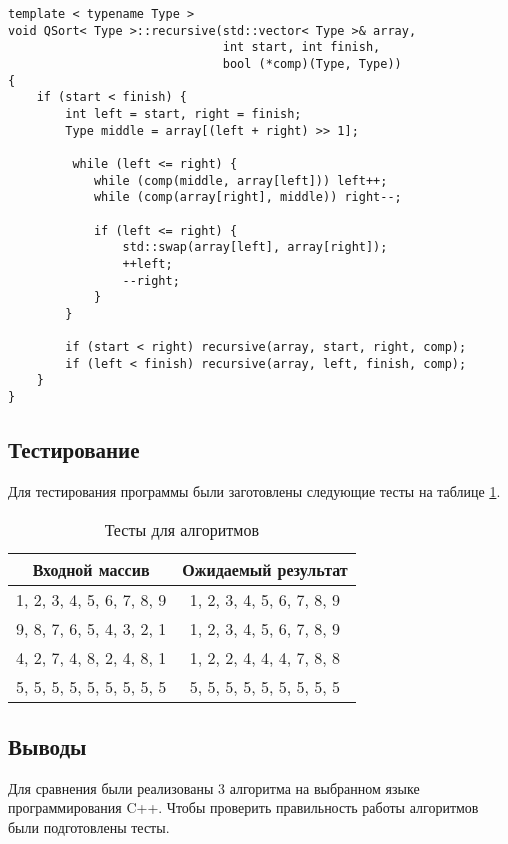 \begin{lstlisting}[caption=Быстрая сортировка,label=list:qsort]
template < typename Type >
void QSort< Type >::recursive(std::vector< Type >& array,
                              int start, int finish,
                              bool (*comp)(Type, Type))
{
    if (start < finish) {
        int left = start, right = finish;
        Type middle = array[(left + right) >> 1];

         while (left <= right) {
            while (comp(middle, array[left])) left++;
            while (comp(array[right], middle)) right--;

            if (left <= right) {
                std::swap(array[left], array[right]);
                ++left;
                --right;
            }
        }

        if (start < right) recursive(array, start, right, comp);
        if (left < finish) recursive(array, left, finish, comp);
    }
}
\end{lstlisting}

\subsection{Тестирование}

Для тестирования программы были заготовлены следующие тесты на таблице \ref{table:test}.

\begin{table}[H]
    \centering
    \caption{Тесты для алгоритмов}
    \label{table:test}
    \begin{tabular}{|c|c|}
        \hline
        Входной массив & Ожидаемый результат \\
        \hline
        1, 2, 3, 4, 5, 6, 7, 8, 9 & 1, 2, 3, 4, 5, 6, 7, 8, 9 \\
        \hline
        9, 8, 7, 6, 5, 4, 3, 2, 1 & 1, 2, 3, 4, 5, 6, 7, 8, 9 \\
        \hline
        4, 2, 7, 4, 8, 2, 4, 8, 1 & 1, 2, 2, 4, 4, 4, 7, 8, 8 \\
        \hline
        5, 5, 5, 5, 5, 5, 5, 5, 5 & 5, 5, 5, 5, 5, 5, 5, 5, 5 \\
        \hline
    \end{tabular}
\end{table}

\subsection{Выводы}

Для сравнения были реализованы 3 алгоритма на выбранном языке
программирования C++. Чтобы проверить правильность работы алгоритмов
были подготовлены тесты.
